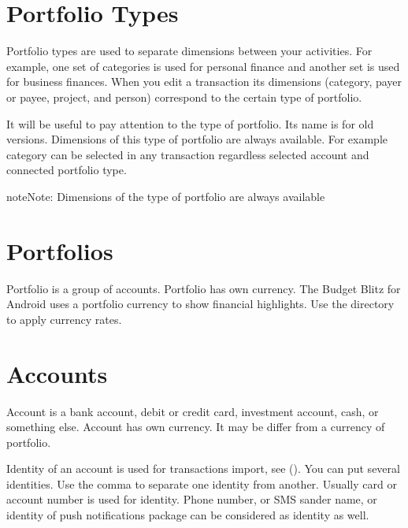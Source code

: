 \documentclass[a4paper,10pt,english]{sphinxmanual}
\begin{document}
\section{Portfolio Types}
\label{\detokenize{directories:portfolio-types}}
\sphinxAtStartPar
Portfolio types are used to separate dimensions between your activities. For example, one set of
categories is used for personal finance and another set is used for business finances. When you
edit a transaction its dimensions (category,  payer or payee, project, and person) correspond
to the certain type of portfolio.

\noindent{}
\noindent{}
\noindent{}

\sphinxAtStartPar
It will be useful to pay attention to the  type of portfolio. Its name is 
for old versions. Dimensions of this type of portfolio are always available. For example 
category can be selected in any transaction regardless selected account and connected portfolio type.

\begin{sphinxadmonition}{note}{Note:}
\sphinxAtStartPar
Dimensions of the  type of portfolio are always available
\end{sphinxadmonition}


\section{Portfolios}
\label{\detokenize{directories:portfolios}}
\sphinxAtStartPar
Portfolio is a group of accounts. Portfolio has own currency. The Budget Blitz for Android uses a portfolio currency
to show financial highlights. Use the  directory to apply currency rates.


\section{Accounts}
\label{\detokenize{directories:accounts}}
\sphinxAtStartPar
Account is a bank account, debit or credit card, investment account, cash, or something else.
Account has own currency. It may be differ from a currency of portfolio.

\sphinxAtStartPar
Identity of an account is used for transactions import, see {\hyperref[\detokenize{import:chapter-import}]{}} ().
You can put several identities. Use the comma to separate one identity from another.
Usually card or account number is used for identity. Phone number, or SMS sander name,
or identity of push notifications package can be considered as identity as well.
\end{document}
